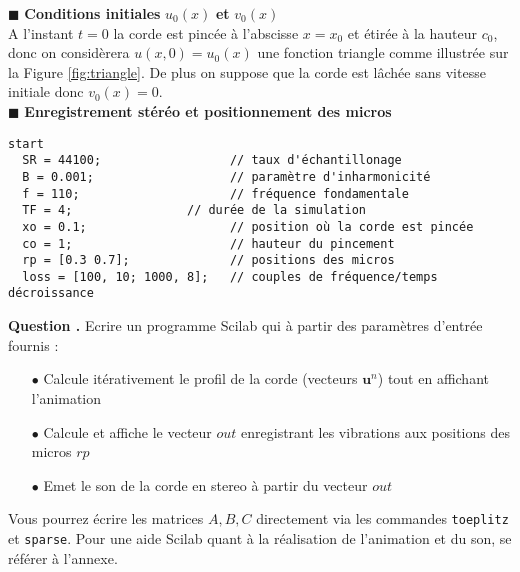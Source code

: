 \documentclass[a4,12pt]{article}
\newcommand{\ub}{\mathbf{u}}
\newcounter{Nbquestion}
\newcommand*\question{%
\stepcounter{Nbquestion}%
\textbf{Question \theNbquestion. }}
\begin{document}
  \hspace{0.5cm} $\blacksquare$ \textbf{Conditions initiales} $u_0(x)$ \textbf{et} $v_0(x)$\\

  A l'instant $t=0$ la corde est pincée à l'abscisse $x=x_0$ et étirée à la hauteur $c_0$, donc on considèrera $u(x,0)=u_0(x)$ une fonction triangle comme illustrée sur la Figure \ref{fig:triangle}. De plus on suppose que la corde est lâchée sans vitesse initiale donc $v_0(x)=0$.\\


  \hspace{0.5cm} $\blacksquare$ \textbf{Enregistrement stéréo et positionnement des micros}\\


  \begin{lstlisting}[frame=single,caption=Paramètres d'entrée]  
  start
  SR = 44100;                  // taux d'échantillonage 
  B = 0.001;                   // paramètre d'inharmonicité
  f = 110;                     // fréquence fondamentale
  TF = 4;			     // durée de la simulation
  xo = 0.1;                    // position où la corde est pincée
  co = 1;                      // hauteur du pincement
  rp = [0.3 0.7];              // positions des micros
  loss = [100, 10; 1000, 8];   // couples de fréquence/temps décroissance
  \end{lstlisting}


  \question Ecrire un programme Scilab qui à partir des paramètres d'entrée fournis : \\

  \begin{itemize}
    \item[$\bullet$] Calcule itérativement le profil de la corde (vecteurs $\ub^n$) tout en affichant l'animation\\
    \item[$\bullet$] Calcule et affiche le vecteur $out$ enregistrant les vibrations aux positions des micros $rp$\\ 	\item[$\bullet$] Emet le son de la corde en stereo à partir du vecteur $out$
  \end{itemize}


  Vous pourrez écrire les matrices $A,B,C$ directement via les commandes \verb"toeplitz" et \verb"sparse".
  Pour une aide Scilab quant à la réalisation de l'animation et du son, se référer à l'annexe.
\end{document}
